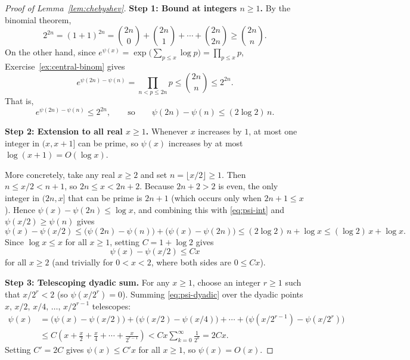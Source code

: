 \documentclass[11pt]{article}
\theoremstyle{plain}
\theoremstyle{definition}
\theoremstyle{boldremark}
\theoremstyle{remark}
\numberwithin{equation}{section}
\begin{document}
\begin{proof}[Proof of Lemma~\ref{lem:chebyshev}]
\textbf{Step 1: Bound at integers $n\geq 1$.}
By the binomial theorem,
\[
 2^{2n} = (1+1)^{2n} = \binom{2n}{0} + \binom{2n}{1} + \cdots + \binom{2n}{2n}
 \geq \binom{2n}{n}.
\]
On the other hand, since $e^{\psi(x)}=\exp\bigl(\sum_{p\leq x}\log p\bigr)=\prod_{p\leq x} p$,
Exercise~\ref{ex:central-binom} gives
\[
 e^{\psi(2n)-\psi(n)} = \prod_{n < p \leq 2n} p \leq \binom{2n}{n} \leq 2^{2n}.
\]
That is,
\begin{equation}\label{eq:psi-int}
 \boxed{\displaystyle e^{\psi(2n)-\psi(n)} \leq 2^{2n},}
 \qquad\text{so}\qquad
 \psi(2n)-\psi(n) \leq (2\log 2)\,n.
\end{equation}

\textbf{Step 2: Extension to all real $x\geq 1$.}
Whenever $x$ increases by $1$, at most one integer in $(x,x+1]$ can be
prime, so $\psi(x)$ increases by at most $\log(x+1)=O(\log x)$.

More concretely, take any real $x\geq 2$ and set $n=\lfloor x/2\rfloor\geq 1$.
Then $n\leq x/2 < n+1$, so $2n\leq x < 2n+2$. Because $2n+2>2$ is even,
the only integer in $(2n,x]$ that can be prime is $2n+1$ (which occurs only
when $2n+1\leq x$). Hence $\psi(x)-\psi(2n)\leq \log x$, and combining this
with \eqref{eq:psi-int} and $\psi(x/2)\geq\psi(n)$ gives
\[
 \psi(x)-\psi(x/2)
 \leq \bigl(\psi(2n)-\psi(n)\bigr) + \bigl(\psi(x)-\psi(2n)\bigr)
 \leq (2\log 2)\,n + \log x
 \leq (\log 2)\,x + \log x.
\]
Since $\log x\leq x$ for all $x\geq 1$, setting $C=1+\log 2$ gives
\begin{equation}\label{eq:psi-dyadic}
 \boxed{\displaystyle \psi(x) - \psi(x/2) \leq C x}
\end{equation}
for all $x\geq 2$ (and trivially for $0 < x < 2$, where both sides are
$0\leq Cx$).

\textbf{Step 3: Telescoping dyadic sum.}
For any $x\geq 1$, choose an integer $r\geq 1$ such that $x/2^r < 2$ (so
$\psi(x/2^r)=0$). Summing \eqref{eq:psi-dyadic} over the dyadic points
$x,\,x/2,\,x/4,\,\dots,\,x/2^{r-1}$ telescopes:
\begin{align*}
 \psi(x)
 &= \bigl(\psi(x)-\psi(x/2)\bigr)
  + \bigl(\psi(x/2)-\psi(x/4)\bigr)
  + \cdots
  + \bigl(\psi(x/2^{r-1})-\psi(x/2^r)\bigr) \\
 &\leq C\left(x + \frac{x}{2} + \frac{x}{4} + \cdots + \frac{x}{2^{r-1}}\right)
  < C x \sum_{k=0}^{\infty}\frac{1}{2^k} = 2C x.
\end{align*}
Setting $C'=2C$ gives $\psi(x)\leq C'x$ for all $x\geq 1$, so $\psi(x)=O(x)$.
\end{proof}
\end{document}
